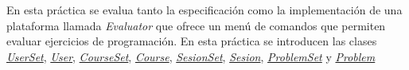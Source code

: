 En esta práctica se evalua tanto la especificación como la implementación de una plataforma llamada {\itshape Evaluator} que ofrece un menú de comandos que permiten evaluar ejercicios de programación. En esta práctica se introducen las clases {\itshape \mbox{\hyperlink{class_user_set}{User\+Set}}}, {\itshape \mbox{\hyperlink{class_user}{User}}}, {\itshape \mbox{\hyperlink{class_course_set}{Course\+Set}}}, {\itshape \mbox{\hyperlink{class_course}{Course}}}, {\itshape \mbox{\hyperlink{class_sesion_set}{Sesion\+Set}}}, {\itshape \mbox{\hyperlink{class_sesion}{Sesion}}}, {\itshape \mbox{\hyperlink{class_problem_set}{Problem\+Set}}} y {\itshape \mbox{\hyperlink{class_problem}{Problem}}} 